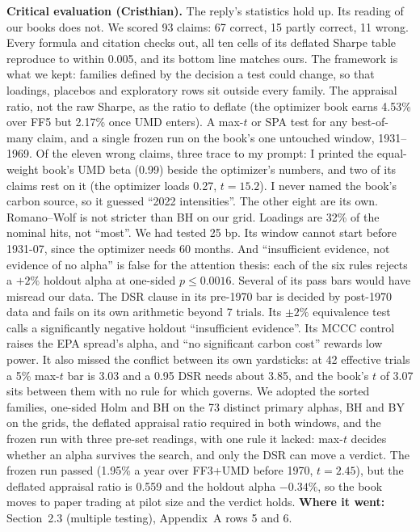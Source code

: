 \textbf{Critical evaluation (Cristhian).} The reply's statistics hold up. Its reading of our books does not. We scored 93 claims: 67 correct, 15 partly correct, 11 wrong. Every formula and citation checks out, all ten cells of its deflated Sharpe table reproduce to within 0.005, and its bottom line matches ours. The framework is what we kept: families defined by the decision a test could change, so that loadings, placebos and exploratory rows sit outside every family. The appraisal ratio, not the raw Sharpe, as the ratio to deflate (the optimizer book earns 4.53\% over FF5 but 2.17\% once UMD enters). A max-$t$ or SPA test for any best-of-many claim, and a single frozen run on the book's one untouched window, 1931--1969. Of the eleven wrong claims, three trace to my prompt: I printed the equal-weight book's UMD beta (0.99) beside the optimizer's numbers, and two of its claims rest on it (the optimizer loads 0.27, $t=15.2$). I never named the book's carbon source, so it guessed ``2022 intensities''. The other eight are its own. Romano--Wolf is not stricter than BH on our grid. Loadings are 32\% of the nominal hits, not ``most''. We had tested 25 bp. Its window cannot start before 1931-07, since the optimizer needs 60 months. And ``insufficient evidence, not evidence of no alpha'' is false for the attention thesis: each of the six rules rejects a $+2\%$ holdout alpha at one-sided $p\leq0.0016$. Several of its pass bars would have misread our data. The DSR clause in its pre-1970 bar is decided by post-1970 data and fails on its own arithmetic beyond 7 trials. Its $\pm2\%$ equivalence test calls a significantly negative holdout ``insufficient evidence''. Its MCCC control raises the EPA spread's alpha, and ``no significant carbon cost'' rewards low power. It also missed the conflict between its own yardsticks: at 42 effective trials a 5\% max-$t$ bar is 3.03 and a 0.95 DSR needs about 3.85, and the book's $t$ of 3.07 sits between them with no rule for which governs. We adopted the sorted families, one-sided Holm and BH on the 73 distinct primary alphas, BH and BY on the grids, the deflated appraisal ratio required in both windows, and the frozen run with three pre-set readings, with one rule it lacked: max-$t$ decides whether an alpha survives the search, and only the DSR can move a verdict. The frozen run passed (1.95\% a year over FF3+UMD before 1970, $t=2.45$), but the deflated appraisal ratio is 0.559 and the holdout alpha $-0.34\%$, so the book moves to paper trading at pilot size and the verdict holds. \textbf{Where it went:} Section~2.3 (multiple testing), Appendix~A rows 5 and 6.


